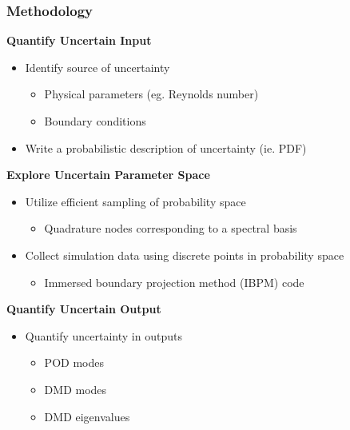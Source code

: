 \documentclass[9pt]{beamer}
\begin{document}
\begin{frame}
\frametitle{Methodology}
\label{sec-2-3}

\textbf{Quantify Uncertain Input}
\begin{itemize}
\item Identify source of uncertainty
\begin{itemize}
\item Physical parameters (eg. Reynolds number)
\item Boundary conditions
\end{itemize}
\item Write a probabilistic description of uncertainty (ie. PDF)
\end{itemize}
\textbf{Explore Uncertain Parameter Space}
\begin{itemize}
\item Utilize efficient sampling of probability space
\begin{itemize}
\item Quadrature nodes corresponding to a spectral basis
\end{itemize}
\item Collect simulation data using discrete points in probability space
\begin{itemize}
\item Immersed boundary projection method (IBPM) code
\end{itemize}
\end{itemize}
\textbf{Quantify Uncertain Output}
\begin{itemize}
\item Quantify uncertainty in outputs
\begin{itemize}
\item POD modes
\item DMD modes
\item DMD eigenvalues
\end{itemize}
\end{itemize}
\end{frame}
\end{document}
